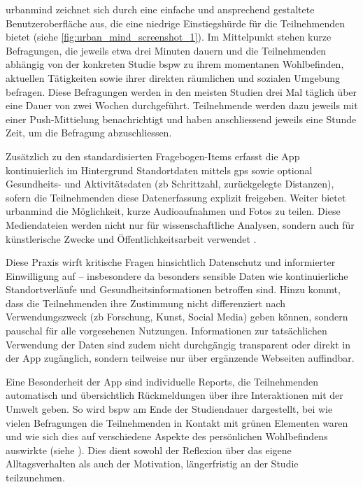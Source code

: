 \gls{urbanmind} zeichnet sich durch eine einfache und ansprechend gestaltete Benutzeroberfläche aus, die eine niedrige Einstiegshürde für die Teilnehmenden bietet (siehe \cref{fig:urban_mind_screenshot_1}). Im Mittelpunkt stehen kurze Befragungen, die jeweils etwa drei Minuten dauern und die Teilnehmenden abhängig von der konkreten Studie \gls{bspw} zu ihrem momentanen Wohlbefinden, aktuellen Tätigkeiten sowie ihrer direkten räumlichen und sozialen Umgebung befragen. Diese Befragungen werden in den meisten Studien drei Mal täglich über eine Dauer von zwei Wochen durchgeführt. Teilnehmende werden dazu jeweils mit einer Push-Mittielung benachrichtigt und haben anschliessend jeweils eine Stunde Zeit, um die Befragung abzuschliessen.

Zusätzlich zu den standardisierten Fragebogen-Items erfasst die App kontinuierlich im Hintergrund Standortdaten mittels \gls{gps} sowie optional Gesundheits- und Aktivitätsdaten (\gls{zb} Schrittzahl, zurückgelegte Distanzen), sofern die Teilnehmenden diese Datenerfassung explizit freigeben. Weiter bietet \gls{urbanmind} die Möglichkeit, kurze Audioaufnahmen und Fotos zu teilen. Diese Mediendateien werden nicht nur für wissenschaftliche Analysen, sondern auch für künstlerische Zwecke und Öffentlichkeitsarbeit verwendet \parencite{UrbanMindPrivacy}.

Diese Praxis wirft kritische Fragen hinsichtlich Datenschutz und informierter Einwilligung auf -- insbesondere da besonders sensible Daten wie kontinuierliche Standortverläufe und Gesundheitsinformationen betroffen sind. Hinzu kommt, dass die Teilnehmenden ihre Zustimmung nicht differenziert nach Verwendungszweck (\gls{zb} Forschung, Kunst, Social Media) geben können, sondern pauschal für alle vorgesehenen Nutzungen. Informationen zur tatsächlichen Verwendung der Daten sind zudem nicht durchgängig transparent oder direkt in der App zugänglich, sondern teilweise nur über ergänzende Webseiten auffindbar.

Eine Besonderheit der App sind individuelle Reports, die Teilnehmenden automatisch und übersichtlich Rückmeldungen über ihre Interaktionen mit der Umwelt geben. So wird \gls{bspw} am Ende der Studiendauer dargestellt, bei wie vielen Befragungen die Teilnehmenden in Kontakt mit grünen Elementen waren und wie sich dies auf verschiedene Aspekte des persönlichen Wohlbefindens auswirkte (siehe ). Dies dient sowohl der Reflexion über das eigene Alltagsverhalten als auch der Motivation, längerfristig an der Studie teilzunehmen.

